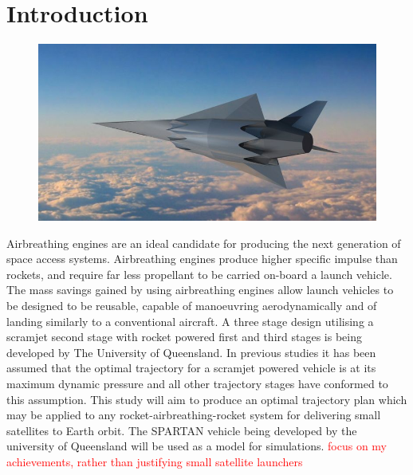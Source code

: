 
\cleardoublepage
\chapter{Introduction}


  	\begin{figure}
  		\centering
  		\includegraphics[width=0.7\linewidth]{figures/1_introduction/project-spartan}
  		\caption{}
  		\label{fig:project-spartan}
  	\end{figure}
  	
  	
  	
  	
  	  Airbreathing engines are an ideal candidate for producing the next generation of space access
  	systems. Airbreathing engines produce higher specific impulse than rockets, and require far less propellant to be carried on-board a launch vehicle. 
  	 The mass savings gained by using airbreathing engines allow launch vehicles to be designed to be reusable, capable of manoeuvring aerodynamically and of landing similarly to a conventional aircraft. A three stage design utilising a scramjet
  	second stage with rocket powered first and third stages is being developed by The University of
  	Queensland. In previous studies it has been assumed that the optimal trajectory for a scramjet powered vehicle is at its
  	maximum dynamic pressure and all other trajectory stages have conformed to this assumption. This study will aim to produce an optimal
  	trajectory plan which may be applied to any rocket-airbreathing-rocket system for delivering small
  	satellites to Earth orbit. The SPARTAN vehicle being developed by the university of Queensland will
  	be used as a model for simulations.
  	\textcolor{red}{focus on my achievements, rather than justifying small satellite launchers}
  	
  
  
